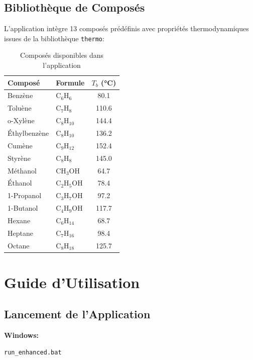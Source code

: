 \documentclass[11pt,a4paper]{article}
\begin{document}
\subsection{Bibliothèque de Composés}

L'application intègre 13 composés prédéfinis avec propriétés thermodynamiques issues de la bibliothèque \texttt{thermo}:

\begin{table}[h]
\centering
\small
\begin{tabular}{llc}
\toprule
\textbf{Composé} & \textbf{Formule} & \textbf{$T_b$ (°C)} \\
\midrule
Benzène & C$_6$H$_6$ & 80.1 \\
Toluène & C$_7$H$_8$ & 110.6 \\
o-Xylène & C$_8$H$_{10}$ & 144.4 \\
Éthylbenzène & C$_8$H$_{10}$ & 136.2 \\
Cumène & C$_9$H$_{12}$ & 152.4 \\
Styrène & C$_8$H$_8$ & 145.0 \\
Méthanol & CH$_3$OH & 64.7 \\
Éthanol & C$_2$H$_5$OH & 78.4 \\
1-Propanol & C$_3$H$_7$OH & 97.2 \\
1-Butanol & C$_4$H$_9$OH & 117.7 \\
Hexane & C$_6$H$_{14}$ & 68.7 \\
Heptane & C$_7$H$_{16}$ & 98.4 \\
Octane & C$_8$H$_{18}$ & 125.7 \\
\bottomrule
\end{tabular}
\caption{Composés disponibles dans l'application}
\end{table}

\section{Guide d'Utilisation}

\subsection{Lancement de l'Application}

\textbf{Windows:}
\begin{verbatim}
run_enhanced.bat
\end{verbatim}
\end{document}

